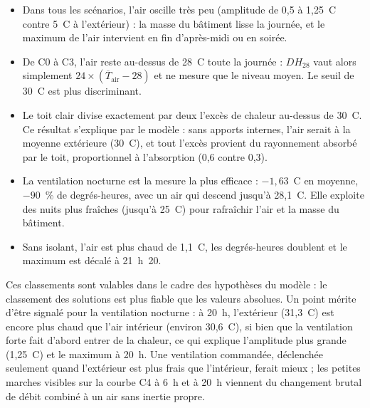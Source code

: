 \begin{itemize}
	\item Dans tous les scénarios, l'air oscille très peu (amplitude de 0,5 à 1,25~\textdegree C contre
	5~\textdegree C à l'extérieur) : la masse du bâtiment lisse la journée, et le maximum de l'air
	intervient en fin d'après-midi ou en soirée.
	\item De C0 à C3, l'air reste au-dessus de 28~\textdegree C toute la journée : $DH_{28}$ vaut alors
	simplement $24\times(\overline{T}_{\mathrm{air}}-28)$ et ne mesure que le niveau moyen. Le seuil de
	30~\textdegree C est plus discriminant.
	\item Le toit clair divise exactement par deux l'excès de chaleur au-dessus de 30~\textdegree C. Ce
	résultat s'explique par le modèle : sans apports internes, l'air serait à la moyenne extérieure
	(30~\textdegree C), et tout l'excès provient du rayonnement absorbé par le toit, proportionnel à
	l'absorption (0,6 contre 0,3).
	\item La ventilation nocturne est la mesure la plus efficace : $-1{,}63$~\textdegree C en moyenne,
	$-90$~\% de degrés-heures, avec un air qui descend jusqu'à 28,1~\textdegree C. Elle exploite des
	nuits plus fraîches (jusqu'à 25~\textdegree C) pour rafraîchir l'air et la masse du bâtiment.
	\item Sans isolant, l'air est plus chaud de 1,1~\textdegree C, les degrés-heures doublent et le maximum
	est décalé à 21~h~20.
\end{itemize}

Ces classements sont valables dans le cadre des hypothèses du modèle : le classement des solutions est plus
fiable que les valeurs absolues. Un point mérite d'être signalé pour la ventilation nocturne : à 20~h,
l'extérieur (31,3~\textdegree C) est encore plus chaud que l'air intérieur (environ 30,6~\textdegree C), si
bien que la ventilation forte fait d'abord entrer de la chaleur, ce qui explique l'amplitude plus grande
(1,25~\textdegree C) et le maximum à 20~h. Une ventilation commandée, déclenchée seulement quand l'extérieur
est plus frais que l'intérieur, ferait mieux ; les petites marches visibles sur la courbe C4 à 6~h et à 20~h
viennent du changement brutal de débit combiné à un air sans inertie propre.